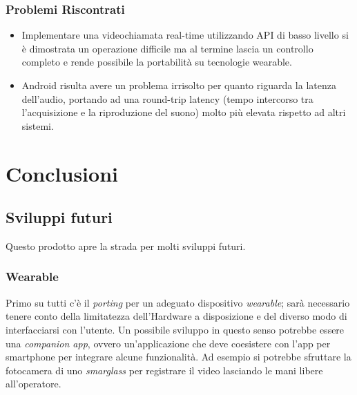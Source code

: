 \documentclass[conference]{IEEEtran}
\begin{document}
		\subsubsection{Problemi Riscontrati}
			\begin{itemize}
				\item Implementare una videochiamata real-time utilizzando API di basso livello si è dimostrata un operazione difficile ma al termine lascia un controllo completo e rende possibile la portabilità su tecnologie wearable.
				\item Android risulta avere un problema irrisolto per quanto riguarda la latenza dell'audio, portando ad una round-trip latency (tempo intercorso tra l'acquisizione e la riproduzione del suono) molto più elevata rispetto ad altri sistemi.
			\end{itemize}





\section{Conclusioni}
	

	\subsection{Sviluppi futuri}
		Questo prodotto apre la strada per molti sviluppi futuri.\\
		\subsubsection{Wearable}
			Primo su tutti c'è il \textit{porting} per un adeguato dispositivo \textit{wearable}; sarà necessario
			tenere conto della limitatezza dell'Hardware a disposizione e del diverso modo di interfacciarsi con l'utente.
			Un possibile sviluppo in questo senso potrebbe essere una \textit{companion app}, ovvero un'applicazione che
			deve coesistere con l'app per smartphone per integrare alcune funzionalità. Ad esempio si potrebbe sfruttare
			la fotocamera di uno \textit{smarglass} per registrare il video lasciando le mani libere all'operatore.\\
\end{document}
